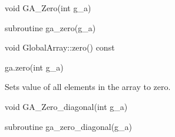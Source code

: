\documentclass[12pt]{article}
\begin{document}

\begin{capi}
\begin{ccode}
void GA_Zero(int g_a)
\end{ccode}
\begin{funcargs}
\end{funcargs}
\end{capi}

\begin{fapi}
\begin{fcode}
subroutine ga_zero(g_a)
\end{fcode}
\begin{funcargs}
\end{funcargs}
\end{fapi}

\begin{cxxapi}
\begin{cxxcode}
void GlobalArray::zero() const
\end{cxxcode}
\end{cxxapi}

\begin{pyapi}
\begin{pycode}
ga.zero(int g_a)
\end{pycode}
\begin{funcargs}
\end{funcargs}
\end{pyapi}

\gcoll

\begin{desc}

Sets value of all elements in the array to zero.

\end{desc}


\begin{capi}
\begin{ccode}
void GA_Zero_diagonal(int g_a)
\end{ccode}
\begin{funcargs}
\end{funcargs}
\end{capi}

\begin{fapi}
\begin{fcode}
subroutine ga_zero_diagonal(g_a)
\end{fcode}
\begin{funcargs}
\end{funcargs}
\end{fapi}
\end{document}
